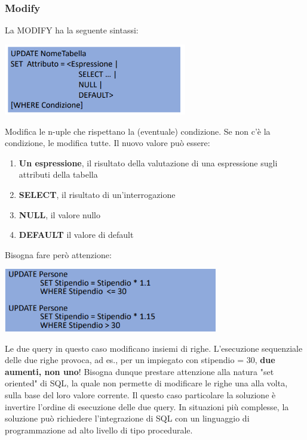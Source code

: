 \documentclass[12pt]{article}
\begin{document}
\subsubsection{Modify}
La MODIFY ha la seguente sintassi:
\begin{center}
    \includegraphics[width = 0.60\textwidth]{Images/206.PNG}
\end{center}
Modifica le n-uple che rispettano la (eventuale) condizione.
Se non c'è la condizione, le modifica tutte.
Il nuovo valore può essere:
\begin{enumerate}
    \item \textbf{Un espressione}, il risultato della valutazione di una espressione sugli attributi della tabella
    \item \textbf{SELECT}, il risultato di un'interrogazione
    \item \textbf{NULL}, il valore nullo
    \item \textbf{DEFAULT} il valore di default
\end{enumerate}
Bisogna fare però attenzione:
\begin{center}
    \includegraphics[width = 0.70\textwidth]{Images/207.PNG}
\end{center}
Le due query in questo caso modificano insiemi di righe.
L'esecuzione sequenziale delle due righe provoca, ad es., per un impiegato con stipendio = 30, \textbf{due aumenti, non uno}!
Bisogna dunque prestare attenzione alla natura "set oriented" di SQL, la quale non permette di modificare le righe una alla volta, sulla base del loro valore corrente.
Il questo caso particolare la soluzione è invertire l'ordine di esecuzione delle due query. In situazioni più complesse, la soluzione può richiedere l'integrazione di SQL con un linguaggio di programmazione ad alto livello di tipo procedurale.
\end{document}
